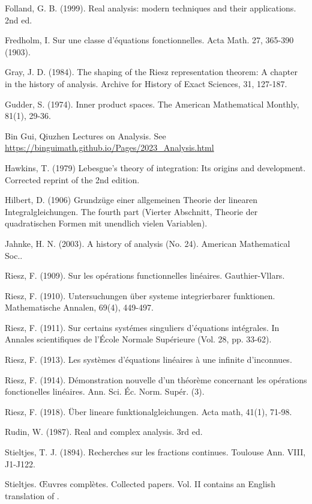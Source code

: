 \documentclass[12pt,b5paper,notitlepage]{article}
\theoremstyle{definition}
\theoremstyle{plain}
\numberwithin{equation}{section}
\begin{document}
	\begin{thebibliography}{999999}
		\footnotesize	

Folland, G. B. (1999). Real analysis: modern techniques and their applications. 2nd ed.

Fredholm, I. Sur une classe d'{\'e}quations fonctionnelles. Acta Math. 27, 365-390 (1903).


Gray, J. D. (1984). The shaping of the Riesz representation theorem: A chapter in the history of analysis. Archive for History of Exact Sciences, 31, 127-187.

Gudder, S. (1974). Inner product spaces. The American Mathematical Monthly, 81(1), 29-36.

Bin Gui, Qiuzhen Lectures on Analysis. See \url{https://binguimath.github.io/Pages/2023_Analysis.html}

Hawkins, T. (1979) Lebesgue's theory of integration: Its origins and development. Corrected reprint of the 2nd edition. 

Hilbert, D. (1906) Grundz\"uge einer allgemeinen Theorie der linearen Integralgleichungen. The fourth part (Vierter Abschnitt, Theorie der quadratischen Formen mit unendlich vielen Variablen).

Jahnke, H. N. (2003). A history of analysis (No. 24). American Mathematical Soc..

Riesz, F. (1909). Sur les op\'erations functionnelles lin\'eaires. Gauthier-Vllars.

Riesz, F. (1910). Untersuchungen \"uber systeme integrierbarer funktionen. Mathematische Annalen, 69(4), 449-497.


Riesz, F. (1911). Sur certains syst\'emes singuliers d'\'equations int\'egrales. In Annales scientifiques de l'\'Ecole Normale Sup\'erieure (Vol. 28, pp. 33-62).

Riesz, F. (1913). Les syst\`emes d'\'equations lin\'eaires \`a une infinite d'inconnues.


Riesz, F. (1914). D{\'e}monstration nouvelle d'un th{\'e}or{\`e}me concernant les op{\'e}rations fonctionelles lin{\'e}aires. Ann. Sci. {\'E}c. Norm. Sup{\'e}r. (3).

Riesz, F. (1918). \"Uber lineare funktionalgleichungen. Acta math, 41(1), 71-98.

Rudin, W. (1987). Real and complex analysis. 3rd ed.


Stieltjes, T. J. (1894). Recherches sur les fractions continues. Toulouse Ann. VIII, J1-J122.

Stieltjes. {\OE}uvres compl{\`e}tes. {Collected} papers. Vol. II contains an English translation of \cite{Sti94}.


		
\end{thebibliography}


\end{document}
